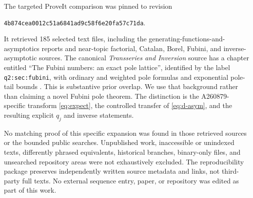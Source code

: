 \documentclass[11pt,letterpaper]{article}
\numberwithin{equation}{section}
\theoremstyle{remark}\newtheorem{remark}[theorem]{Remark}
\begin{document}
The targeted ProveIt comparison was pinned to revision
\begin{center}\small\texttt{4b874cea0012c51a6841ad9c58f6e20fa57c71da}.
\end{center}
It retrieved 185 selected text files, including the generating-functions-and-asymptotics reports and near-topic factorial, Catalan, Borel, Fubini, and inverse-asymptotic sources. The canonical \emph{Transseries and Inversion} source has a chapter entitled ``The Fubini numbers: an exact pole lattice'', identified by the label \texttt{q2:sec:fubini}, with ordinary and weighted pole formulas and exponential pole-tail bounds \cite{proveit}. This is substantive prior overlap. We use that background rather than claiming a novel Fubini pole theorem. The distinction is the A260879-specific transform \eqref{eq:expect}, the controlled transfer of \eqref{eq:d-asym}, and the resulting explicit $q_j$ and inverse statements.

No matching proof of this specific expansion was found in those retrieved sources or the bounded public searches. Unpublished work, inaccessible or unindexed texts, differently phrased equivalents, historical branches, binary-only files, and unsearched repository areas were not exhaustively excluded. The reproducibility package preserves independently written source metadata and links, not third-party full texts. No external sequence entry, paper, or repository was edited as part of this work.
\end{document}
